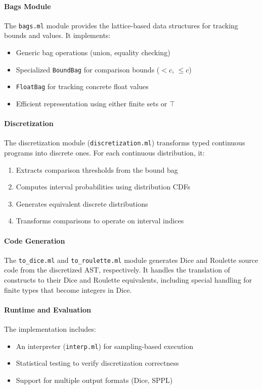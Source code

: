 \paragraph{Bags Module} The \texttt{bags.ml} module provides the lattice-based data structures for tracking bounds and values. It implements:
\begin{itemize}
    \item Generic bag operations (union, equality checking)
    \item Specialized \texttt{BoundBag} for comparison bounds ($<c$, $\leq c$)
    \item \texttt{FloatBag} for tracking concrete float values
    \item Efficient representation using either finite sets or $\top$
\end{itemize}

\paragraph{Discretization} The discretization module (\texttt{discretization.ml}) transforms typed continuous programs into discrete ones. For each continuous distribution, it:
\begin{enumerate}
    \item Extracts comparison thresholds from the bound bag
    \item Computes interval probabilities using distribution CDFs
    \item Generates equivalent discrete distributions
    \item Transforms comparisons to operate on interval indices
\end{enumerate}

\paragraph{Code Generation} The \texttt{to\_dice.ml} and \texttt{to\_roulette.ml} module generates Dice and Roulette source code from the discretized AST, respectively. It handles the translation of \Slice{} constructs to their Dice and Roulette equivalents, including special handling for finite types that become integers in Dice.

\paragraph{Runtime and Evaluation} The implementation includes:
\begin{itemize}
    \item An interpreter (\texttt{interp.ml}) for sampling-based execution
    \item Statistical testing to verify discretization correctness
    \item Support for multiple output formats (Dice, SPPL)
\end{itemize}

